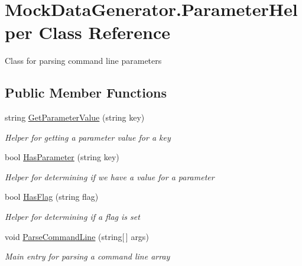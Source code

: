 \hypertarget{class_mock_data_generator_1_1_parameter_helper}{}\section{Mock\+Data\+Generator.\+Parameter\+Helper Class Reference}
\label{class_mock_data_generator_1_1_parameter_helper}


Class for parsing command line parameters  


\subsection*{Public Member Functions}
\begin{DoxyCompactItemize}
\item 
string \hyperlink{class_mock_data_generator_1_1_parameter_helper_ac76986f4ba0225636a3a0ae6dabe458c}{Get\+Parameter\+Value} (string key)
\begin{DoxyCompactList}\small\item\em Helper for getting a parameter value for a key \end{DoxyCompactList}\item 
bool \hyperlink{class_mock_data_generator_1_1_parameter_helper_a15a7f2758fb3db6c6fbf045a789b84b6}{Has\+Parameter} (string key)
\begin{DoxyCompactList}\small\item\em Helper for determining if we have a value for a parameter \end{DoxyCompactList}\item 
bool \hyperlink{class_mock_data_generator_1_1_parameter_helper_ad6f5470bdf0c000ab8aa71911d86b2d7}{Has\+Flag} (string flag)
\begin{DoxyCompactList}\small\item\em Helper for determining if a flag is set \end{DoxyCompactList}\item 
void \hyperlink{class_mock_data_generator_1_1_parameter_helper_a65434df99de99645229d4ebf1f6e358d}{Parse\+Command\+Line} (string\mbox{[}$\,$\mbox{]} args)
\begin{DoxyCompactList}\small\item\em Main entry for parsing a command line array \end{DoxyCompactList}\end{DoxyCompactItemize}
